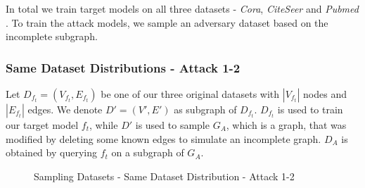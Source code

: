       In total we train target models on all three datasets - \emph{Cora}, \emph{CiteSeer} and \emph{Pubmed} .
      To train the attack models, we sample an adversary dataset based on the incomplete subgraph.

      \subsubsection*{Same Dataset Distributions - Attack 1-2}
        Let $D_{f_t} = (V_{f_t}, E_{f_t})$ be one of our three original datasets with $|V_{f_t}|$ nodes and $|E_{f_t}|$ edges.
        We denote $D' = (V',E')$ as subgraph of $D_{f_t}$.
        $D_{f_t}$ is used to train our target model $f_t$, while $D'$ is used to sample $G_{A}$, which is a graph, that was modified by deleting some known edges to simulate an incomplete graph.
        $D_A$ is obtained by querying $f_t$ on a subgraph of $G_A$. 

        \vspace{0.48cm}
        \begin{figure}[h!]
          \begin{center}
          \end{center}
          \caption{Sampling Datasets - Same Dataset Distribution - Attack 1-2}
          \label{figure:sample-datasets-attack1-2}
        \end{figure}

